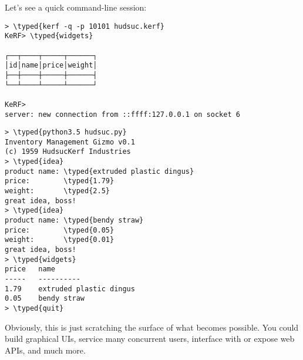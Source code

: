 \documentclass{article}
\newcommand{\typed}[1]{\textcolor{TealBlue}{#1}}
\begin{document}
\pagebreak
Let's see a quick command-line session:
\begin{Verbatim}
> \typed{kerf -q -p 10101 hudsuc.kerf}
KeRF> \typed{widgets}

┌──┬────┬─────┬──────┐
│id│name│price│weight│
├──┼────┼─────┼──────┤
└──┴────┴─────┴──────┘

KeRF>
server: new connection from ::ffff:127.0.0.1 on socket 6
\end{Verbatim}
\begin{Verbatim}
> \typed{python3.5 hudsuc.py}
Inventory Management Gizmo v0.1
(c) 1959 HudsucKerf Industries
> \typed{idea}
product name: \typed{extruded plastic dingus}
price:        \typed{1.79}
weight:       \typed{2.5}
great idea, boss!
> \typed{idea}
product name: \typed{bendy straw}
price:        \typed{0.05}
weight:       \typed{0.01}
great idea, boss!
> \typed{widgets}
price	name
-----	----------
1.79	extruded plastic dingus
0.05	bendy straw
> \typed{quit}
\end{Verbatim}

Obviously, this is just scratching the surface of what becomes possible. You could build graphical UIs, service many concurrent users, interface with or expose web APIs, and much more.
\end{document}
